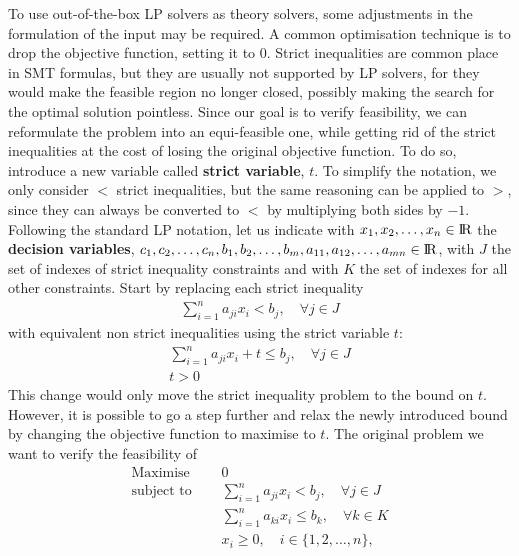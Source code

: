 \documentclass[runningheads]{llncs}
\begin{document}
To use out-of-the-box LP solvers as theory solvers, some adjustments in the formulation of the input may be required.
A common optimisation technique is to drop the objective function, setting it to $0$.
Strict inequalities are common place in SMT formulas, but they are usually not supported by LP solvers, for they would make the feasible region no longer closed, possibly making the search for the optimal solution pointless.
Since our goal is to verify feasibility, we can reformulate the problem into an equi-feasible one, while getting rid of the strict inequalities at the cost of losing the original objective function.
To do so, introduce a new variable called \textbf{strict variable}, $t$.
To simplify the notation, we only consider $<$ strict inequalities, but the same reasoning can be applied to $>$, since they can always be converted to $<$ by multiplying both sides by $-1$.
Following the standard LP notation, let us indicate with $x_1, x_2, \ldots, x_n \in {\rm I\!R}$ the \textbf{decision variables}, $c_1, c_2, \ldots, c_n, b_{1}, b_{2}, \ldots, b_{m}, a_{11}, a_{12}, \ldots, a_{mn} \in {\rm I\!R}$, with $J$ the set of indexes of strict inequality constraints and with $K$ the set of indexes for all other constraints.
Start by replacing each strict inequality
\begin{align*}
    \sum_{i=1}^{n} a_{ji}x_{i} < b_j, \quad \forall j \in J
\end{align*}
with equivalent non strict inequalities using the strict variable $t$:
\begin{align*}
    \sum_{i=1}^{n} a_{ji}x_{i} + t \le b_j, \quad \forall j \in J \\
    t > 0
\end{align*}
This change would only move the strict inequality problem to the bound on $t$.
However, it is possible to go a step further and relax the newly introduced bound by changing the objective function to maximise to $t$.
The original problem we want to verify the feasibility of
\begin{equation}
    \label{eq:lp-original}
    \begin{split}
        \text{Maximise }   \quad & 0                                                          \\
        \text{subject to } \quad & \sum_{i=1}^{n} a_{ji}x_{i} < b_j,   \quad \forall j \in J  \\
        \quad                    & \sum_{i=1}^{n} a_{ki}x_{i} \le b_k,  \quad \forall k \in K \\
        & x_i \ge 0,  \quad i \in \{1, 2, \ldots, n\},
    \end{split}
\end{equation}
\end{document}
